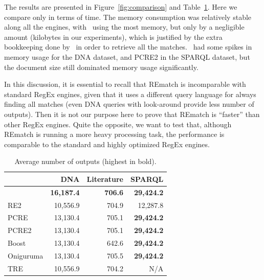 The results are presented in Figure~\ref{fig:comparison} and
Table~\ref{tab:outputs}. Here we compare only in terms of time. The memory
consumption was relatively stable along all the engines, with \rematch\ using
the most memory, but only by a negligible amount (kilobytes in our experiments),
which is justified by the extra bookkeeping done by \rematch\ in order to
retrieve all the matches.  \rematch\ had some spikes in memory usage for the
\textsf{DNA} dataset, and \textsf{PCRE2} in the \textsf{SPARQL} dataset, but the
document size still dominated memory usage significantly.

In this discussion, it is essential to recall that REmatch is incomparable with
standard RegEx engines, given that it uses a different query language for always
finding all matches (even DNA queries with look-around provide less number of
outputs). Then it is not our purpose here to prove that REmatch is ``faster''
than other RegEx engines. Quite the opposite, we want to test that, although
REmatch is running a more heavy processing task, the performance is comparable
to the standard and highly optimized RegEx engines.

\begin{table}
	\begin{tabular}{l|rrr}
		                   & \textsf{DNA}      & \textsf{Literature} &
		                   \textsf{SPARQL}   \\
		\hline
		\rematch           & \textbf{16,187.4} & \textbf{706.6}      &
		\textbf{29,424.2} \\
		\textsf{RE2}       & 10,556.9          & 704.9               & 12,287.8
		\\
		\textsf{PCRE}      & 13,130.4          & 705.1               &
		\textbf{29,424.2} \\
		\textsf{PCRE2}     & 13,130.4          & 705.1               &
		\textbf{29,424.2} \\
		\textsf{Boost}     & 13,130.4          & 642.6               &
		\textbf{29,424.2} \\
		\textsf{Oniguruma} & 13,130.4          & 705.5               &
		\textbf{29,424.2} \\
		\textsf{TRE}       & 10,556.9          & 704.2               & N/A
	\end{tabular}
	\caption{Average number of outputs (highest in bold).}
	\label{tab:outputs}
\end{table}

